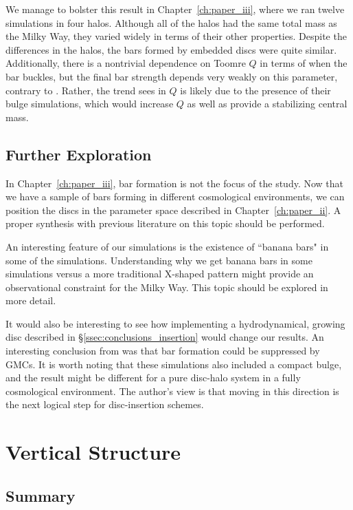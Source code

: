 We manage to bolster this result in Chapter~\ref{ch:paper_iii}, where we ran twelve simulations in four halos. Although all of the halos had the same total mass as the Milky Way, they varied widely in terms of their other properties. Despite the differences in the halos, the bars formed by embedded discs were quite similar. Additionally, there is a nontrivial dependence on Toomre $Q$ in terms of when the bar buckles, but the final bar strength depends very weakly on this parameter, contrary to \citet{YurinSpringelStellarDisks}. Rather, the trend \citet{YurinSpringelStellarDisks} sees in $Q$ is likely due to the presence of their bulge simulations, which would increase $Q$ as well as provide a stabilizing central mass.


\subsection{Further Exploration}


In Chapter~\ref{ch:paper_iii}, bar formation is not the focus of the study. Now that we have a sample of bars forming in different cosmological environments, we can position the discs in the parameter space described in Chapter~\ref{ch:paper_ii}. A proper synthesis with previous literature on this topic should be performed.

An interesting feature of our simulations is the existence of ``banana bars" in some of the simulations. Understanding why we get banana bars in some simulations versus a more traditional X-shaped pattern might provide an observational constraint for the Milky Way. This topic should be explored in more detail.

It would also be interesting to see how implementing a hydrodynamical, growing disc described in \S\ref{ssec:conclusions_insertion} would change our results. An interesting conclusion from \citet{aumer_2016} was that bar formation could be suppressed by GMCs. It is worth noting that these simulations also included a compact bulge, and the result might be different for a pure disc-halo system in a fully cosmological environment. The author's view is that moving in this direction is the next logical step for disc-insertion schemes. 



\section{Vertical Structure}
\subsection{Summary}

